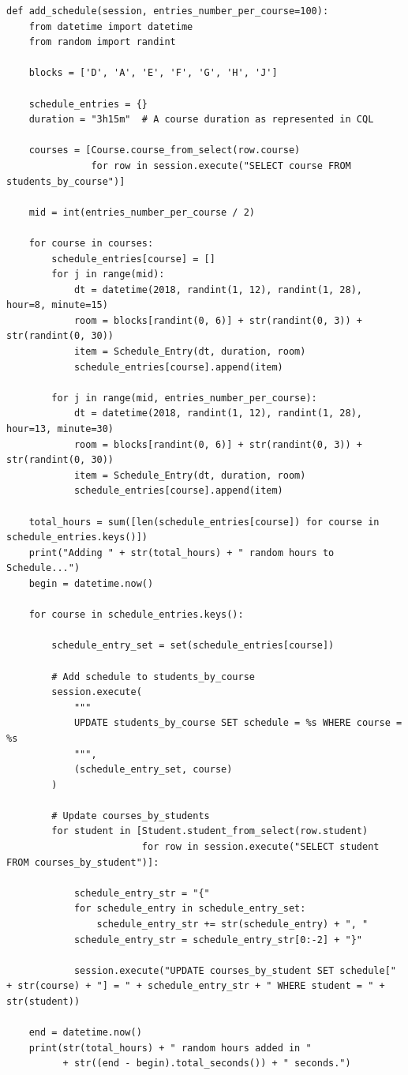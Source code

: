 \documentclass[a4paper, 11pt]{article}
\begin{document}
\begin{tcolorbox}
\begin{verbatim}
def add_schedule(session, entries_number_per_course=100):
    from datetime import datetime
    from random import randint

    blocks = ['D', 'A', 'E', 'F', 'G', 'H', 'J']

    schedule_entries = {}
    duration = "3h15m"  # A course duration as represented in CQL

    courses = [Course.course_from_select(row.course)
               for row in session.execute("SELECT course FROM students_by_course")]

    mid = int(entries_number_per_course / 2)

    for course in courses:
        schedule_entries[course] = []
        for j in range(mid):
            dt = datetime(2018, randint(1, 12), randint(1, 28), hour=8, minute=15)
            room = blocks[randint(0, 6)] + str(randint(0, 3)) + str(randint(0, 30))
            item = Schedule_Entry(dt, duration, room)
            schedule_entries[course].append(item)

        for j in range(mid, entries_number_per_course):
            dt = datetime(2018, randint(1, 12), randint(1, 28), hour=13, minute=30)
            room = blocks[randint(0, 6)] + str(randint(0, 3)) + str(randint(0, 30))
            item = Schedule_Entry(dt, duration, room)
            schedule_entries[course].append(item)

    total_hours = sum([len(schedule_entries[course]) for course in schedule_entries.keys()])
    print("Adding " + str(total_hours) + " random hours to Schedule...")
    begin = datetime.now()

    for course in schedule_entries.keys():

        schedule_entry_set = set(schedule_entries[course])

        # Add schedule to students_by_course
        session.execute(
            """
            UPDATE students_by_course SET schedule = %s WHERE course = %s
            """,
            (schedule_entry_set, course)
        )

        # Update courses_by_students
        for student in [Student.student_from_select(row.student)
                        for row in session.execute("SELECT student FROM courses_by_student")]:

            schedule_entry_str = "{"
            for schedule_entry in schedule_entry_set:
                schedule_entry_str += str(schedule_entry) + ", "
            schedule_entry_str = schedule_entry_str[0:-2] + "}"

            session.execute("UPDATE courses_by_student SET schedule[" + str(course) + "] = " + schedule_entry_str + " WHERE student = " + str(student))

    end = datetime.now()
    print(str(total_hours) + " random hours added in "
          + str((end - begin).total_seconds()) + " seconds.")
\end{verbatim}
\end{tcolorbox}
\normalsize
\end{document}
